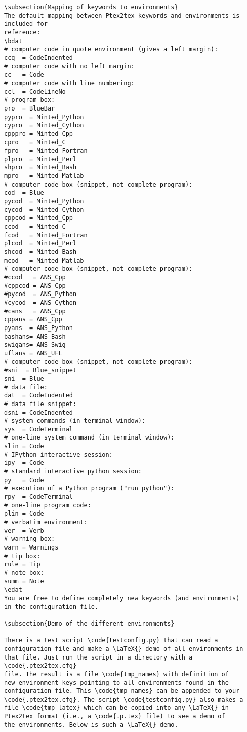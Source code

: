 \documentclass[a4paper,11pt]{article}
\begin{document}
{\begin{Verbatim}
\subsection{Mapping of keywords to environments}
The default mapping between Ptex2tex keywords and environments is included for
reference:
\bdat
# computer code in quote environment (gives a left margin):
ccq  = CodeIndented
# computer code with no left margin:
cc   = Code
# computer code with line numbering:
ccl  = CodeLineNo
# program box:
pro  = BlueBar
pypro  = Minted_Python
cypro  = Minted_Cython
cpppro = Minted_Cpp
cpro   = Minted_C
fpro   = Minted_Fortran
plpro  = Minted_Perl
shpro  = Minted_Bash
mpro   = Minted_Matlab
# computer code box (snippet, not complete program):
cod  = Blue
pycod  = Minted_Python
cycod  = Minted_Cython
cppcod = Minted_Cpp
ccod   = Minted_C
fcod   = Minted_Fortran
plcod  = Minted_Perl
shcod  = Minted_Bash
mcod   = Minted_Matlab
# computer code box (snippet, not complete program):
#ccod   = ANS_Cpp
#cppcod = ANS_Cpp
#pycod  = ANS_Python
#cycod  = ANS_Cython
#cans   = ANS_Cpp
cppans = ANS_Cpp
pyans  = ANS_Python
bashans= ANS_Bash
swigans= ANS_Swig
uflans = ANS_UFL
# computer code box (snippet, not complete program):
#sni  = Blue_snippet
sni  = Blue
# data file:
dat  = CodeIndented
# data file snippet:
dsni = CodeIndented
# system commands (in terminal window):
sys  = CodeTerminal
# one-line system command (in terminal window):
slin = Code
# IPython interactive session:
ipy  = Code
# standard interactive python session:
py   = Code
# execution of a Python program ("run python"):
rpy  = CodeTerminal
# one-line program code:
plin = Code
# verbatim environment:
ver  = Verb
# warning box:
warn = Warnings
# tip box:
rule = Tip
# note box:
summ = Note
\edat
You are free to define completely new keywords (and environments)
in the configuration file.

\subsection{Demo of the different environments}

There is a test script \code{testconfig.py} that can read a
configuration file and make a \LaTeX{} demo of all environments in
that file. Just run the script in a directory with a \code{.ptex2tex.cfg}
file. The result is a file \code{tmp_names} with definition of
new environment keys pointing to all environments found in the
configuration file. This \code{tmp_names} can be appended to your
\code{.ptex2tex.cfg}. The script \code{testconfig.py} also makes a
file \code{tmp_latex} which can be copied into any \LaTeX{} in
Ptex2tex format (i.e., a \code{.p.tex} file) to see a demo of
the environments. Below is such a \LaTeX{} demo.


\end{Verbatim}}
\end{document}
